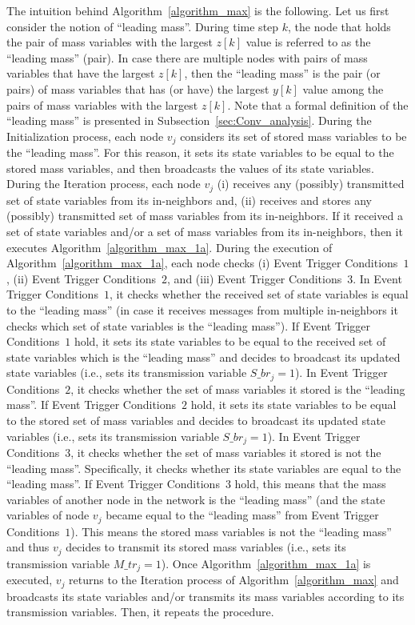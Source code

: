 \documentclass[twocolumn]{autart}    %
\begin{document}
The intuition behind Algorithm~\ref{algorithm_max} is the following. 
Let us first consider the notion of ``leading mass''.
During time step $k$, the node that holds the pair of mass variables with the largest $z[k]$ value is referred to as the ``leading mass'' (pair). 
In case there are multiple nodes with pairs of mass variables that have the largest $z[k]$, then the ``leading mass'' is the pair (or pairs) of mass variables that has (or have) the largest $y[k]$ value among the pairs of mass variables with the largest $z[k]$. 
Note that a formal definition of the ``leading mass'' is presented in Subsection~\ref{sec:Conv_analysis}. 
During the Initialization process, each node $v_j$ considers its set of stored mass variables to be the ``leading mass''. 
For this reason, it sets its state variables to be equal to the stored mass variables, and then broadcasts the values of its state variables. 
During the Iteration process, each node $v_j$ (i) receives any (possibly) transmitted set of state variables from its in-neighbors and, (ii) receives and stores any (possibly) transmitted set of mass variables from its in-neighbors. 
If it received a set of state variables and/or a set of mass variables from its in-neighbors, then it executes Algorithm~\ref{algorithm_max_1a}. 
During the execution of Algorithm~\ref{algorithm_max_1a}, each node checks (i) Event Trigger Conditions~$1$, (ii) Event Trigger Conditions~$2$, and (iii) Event Trigger Conditions~$3$. 
In Event Trigger Conditions~$1$, it checks whether the received set of state variables is equal to the ``leading mass'' (in case it receives messages from multiple in-neighbors it checks which set of state variables is the ``leading mass''). 
If Event Trigger Conditions~$1$ hold, it sets its state variables to be equal to the received set of state variables which is the ``leading mass'' and decides to broadcast its updated state variables (i.e., sets its transmission variable $S\_br_j = 1$). 
In Event Trigger Conditions~$2$, it checks whether the set of mass variables it stored is the ``leading mass''. 
If Event Trigger Conditions~$2$ hold, it sets its state variables to be equal to the stored set of mass variables and decides to broadcast its updated state variables (i.e., sets its transmission variable $S\_br_j = 1$). 
In Event Trigger Conditions~$3$, it checks whether the set of mass variables it stored is not the ``leading mass''. 
Specifically, it checks whether its state variables are equal to the ``leading mass''.  
If Event Trigger Conditions~$3$ hold, this means that the mass variables of another node in the network is the ``leading mass'' (and the state variables of node $v_j$ became equal to the ``leading mass'' from Event Trigger Conditions~$1$). 
This means the stored mass variables is not the ``leading mass'' and thus $v_j$ decides to transmit its stored mass variables (i.e., sets its transmission variable $M\_tr_j = 1$). 
Once Algorithm~\ref{algorithm_max_1a} is executed, $v_j$ returns to the Iteration process of Algorithm~\ref{algorithm_max} and broadcasts its state variables and/or transmits its mass variables according to its transmission variables.  
Then, it repeats the procedure. 
\end{document}
